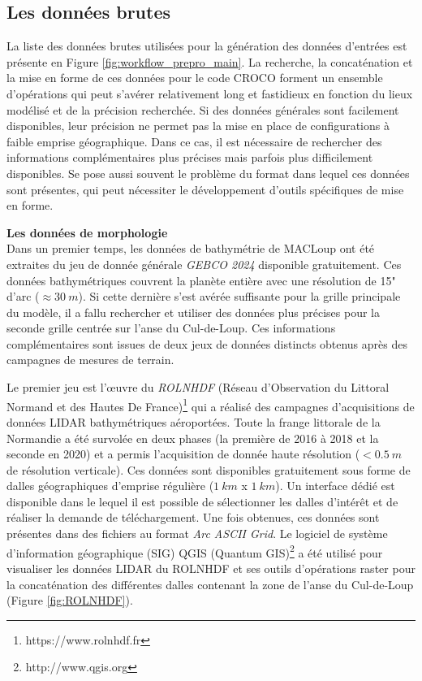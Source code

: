 \documentclass[10pt,a4paper,titlepage]{article}
\begin{document}
\subsection{Les données brutes}
\label{sub:donnes_brutes}

La liste des données brutes utilisées pour la génération des données d'entrées est présente en Figure \ref{fig:workflow_prepro_main}.
La recherche, la concaténation et la mise en forme de ces données pour le code CROCO forment un ensemble d'opérations qui peut s'avérer relativement long et fastidieux en fonction du lieux modélisé et de la précision recherchée.
Si des données générales sont facilement disponibles, leur précision ne permet pas la mise en place de configurations à faible emprise géographique.
Dans ce cas, il est nécessaire de rechercher des informations complémentaires plus précises mais parfois plus difficilement disponibles.
Se pose aussi souvent le problème du format dans lequel ces données sont présentes, qui peut nécessiter le développement d'outils spécifiques de mise en forme.

\textbf{Les données de morphologie}\\
Dans un premier temps, les données de bathymétrie de MACLoup ont été extraites du jeu de donnée générale \textit{GEBCO 2024} disponible gratuitement.
Ces données bathymétriques couvrent la planète entière avec une résolution de 15" d'arc ($\approx30~m$).
Si cette dernière s'est avérée suffisante pour la grille principale du modèle, il a fallu rechercher et utiliser des données plus précises pour la seconde grille centrée sur l'anse du Cul-de-Loup.
Ces informations complémentaires sont issues de deux jeux de données distincts obtenus après des campagnes de mesures de terrain.

Le premier jeu est l'\oe{}uvre du \textit{ROLNHDF} (Réseau d'Observation du Littoral Normand et des Hautes De France)\footnote{https://www.rolnhdf.fr} qui a réalisé des campagnes d'acquisitions de données LIDAR bathymétriques aéroportées. 
Toute la frange littorale de la Normandie a été survolée en deux phases (la première de 2016 à 2018 et la seconde en 2020) et a permis l'acquisition de donnée haute résolution ($<0.5~m$ de résolution verticale). 
Ces données sont disponibles gratuitement sous forme de dalles géographiques d'emprise régulière ($1~km$ x $1~km$). 
Un interface dédié est disponible dans le lequel il est possible de sélectionner les dalles d'intérêt et de réaliser la demande de téléchargement. 
Une fois obtenues, ces données sont présentes dans des fichiers au format \textit{Arc ASCII Grid}. 
Le logiciel de système d'information géographique (SIG) QGIS (Quantum GIS)\footnote{http://www.qgis.org} a été utilisé pour visualiser les données LIDAR du ROLNHDF et ses outils d'opérations raster pour la concaténation des différentes dalles contenant la zone de l'anse du Cul-de-Loup (Figure \ref{fig:ROLNHDF}).
\end{document}
